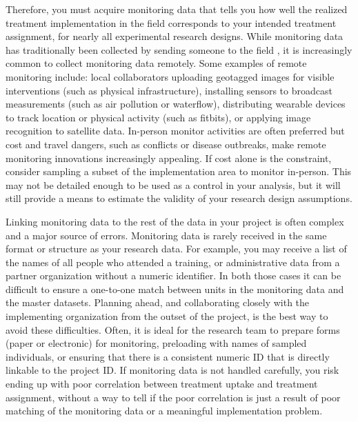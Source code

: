 Therefore, you must acquire monitoring data that
tells you how well the realized treatment implementation in the field
corresponds to your intended treatment assignment,
for nearly all experimental research designs.
While monitoring data has traditionally been collected by sending someone to the field ,
it is increasingly common to collect monitoring data remotely.
Some examples of remote monitoring include: 
local collaborators uploading geotagged images for visible interventions (such as physical infrastructure),
installing sensors to broadcast measurements (such as air pollution or waterflow),
distributing wearable devices to track location or physical activity (such as fitbits),
or applying image recognition to satellite data.
In-person monitor activities are often preferred but
cost and travel dangers, such as conflicts or disease outbreaks,
make remote monitoring innovations increasingly appealing.
If cost alone is the constraint,
consider sampling a subset of the implementation area to monitor in-person.
This may not be detailed enough to be used as a control in your analysis,
but it will still provide a means to
estimate the validity of your research design assumptions.

Linking monitoring data to the rest of the data in your project
is often complex and a major source of errors.
Monitoring data is rarely received in the same format or structure as your research data.
For example, you may receive a list of the names of all people who attended a training,
or administrative data from a partner organization without a numeric identifier.
In both those cases it can be difficult to ensure a one-to-one match
between units in the monitoring data and the master datasets.
Planning ahead, and collaborating closely with the implementing 
organization from the outset of the project,
is the best way to avoid these difficulties.
Often, it is ideal for the research team to prepare forms (paper or electronic) for monitoring,
preloading with names of sampled individuals, 
or ensuring that there is a consistent numeric ID that is directly linkable to the project ID.
If monitoring data is not handled carefully, you risk ending up with poor correlation
between treatment uptake and treatment assignment,
without a way to tell if the poor correlation is just
a result of poor matching of the monitoring data or a meaningful implementation problem. 

